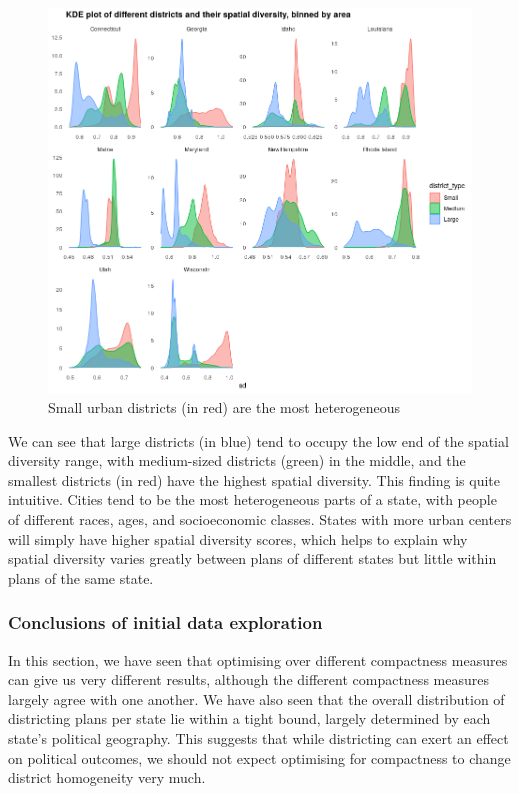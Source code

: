 \documentclass[]{article}
\begin{document}
\begin{figure}
\centering
\includegraphics{../30_results/size_and_sd.png}
\caption{Small urban districts (in red) are the most heterogeneous
\label{pairwise_plot}}
\end{figure}

We can see that large districts (in blue) tend to occupy the low end of
the spatial diversity range, with medium-sized districts (green) in the
middle, and the smallest districts (in red) have the highest spatial
diversity. This finding is quite intuitive. Cities tend to be the most
heterogeneous parts of a state, with people of different races, ages,
and socioeconomic classes. States with more urban centers will simply
have higher spatial diversity scores, which helps to explain why spatial
diversity varies greatly between plans of different states but little
within plans of the same state.

\hypertarget{conclusions-of-initial-data-exploration}{%
\subsubsection{Conclusions of initial data
exploration}\label{conclusions-of-initial-data-exploration}}

In this section, we have seen that optimising over different compactness
measures can give us very different results, although the different
compactness measures largely agree with one another. We have also seen
that the overall distribution of districting plans per state lie within
a tight bound, largely determined by each state's political geography.
This suggests that while districting can exert an effect on political
outcomes, we should not expect optimising for compactness to change
district homogeneity very much.
\end{document}
